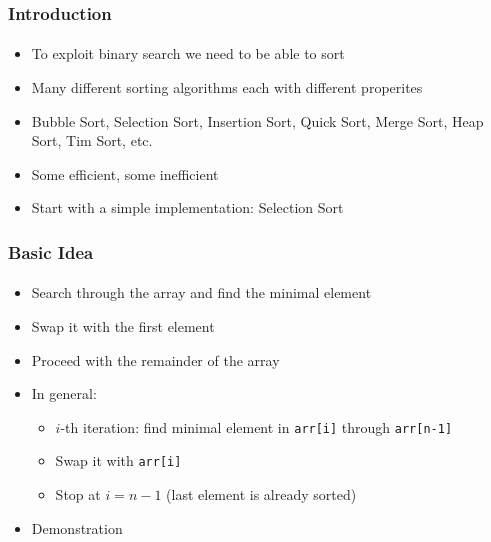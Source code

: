 \documentclass[]{beamer}
\begin{document}
\begin{frame}[fragile]
  \frametitle{Introduction}
  \framesubtitle{}

\begin{itemize}[<+->]
  \item To exploit binary search we need to be able to sort
  \item Many different sorting algorithms each with different properites
  \item Bubble Sort, Selection Sort, Insertion Sort, Quick Sort, Merge Sort, 
  Heap Sort, Tim Sort, etc.
  \item Some efficient, some inefficient
  \item Start with a simple implementation: Selection Sort 
\end{itemize} 

\end{frame}

\begin{frame}[fragile]
  \frametitle{Basic Idea}
  \framesubtitle{} 
  
\begin{itemize}[<+->]
  \item Search through the array and find the minimal element
  \item Swap it with the first element
  \item Proceed with the remainder of the array
  \item In general: 
  \begin{itemize}
    \item $i$-th iteration: find minimal element in \texttt{arr[i]} through
     \texttt{arr[n-1]}
    \item Swap it with \texttt{arr[i]}
    \item Stop at $i=n-1$ (last element is already sorted)
  \end{itemize}
  \item Demonstration
\end{itemize}
  
\end{frame}
\end{document}
